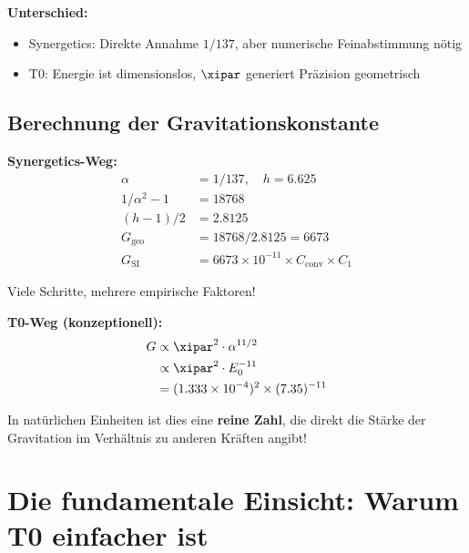 	\textbf{Unterschied:}
	\begin{itemize}
		\item Synergetics: Direkte Annahme $1/137$, aber numerische Feinabstimmung nötig
		\item T0: Energie ist dimensionslos, $\xipar$ generiert Präzision geometrisch
	\end{itemize}
	
	\subsection{Berechnung der Gravitationskonstante}
	
	\textbf{Synergetics-Weg:}
	\begin{align}
		\alpha &= 1/137, \quad h = 6.625 \\
		1/\alpha^2 - 1 &= 18768 \\
		(h-1)/2 &= 2.8125 \\
		G_{\text{geo}} &= 18768 / 2.8125 = 6673 \\
		G_{\text{SI}} &= 6673 \times 10^{-11} \times C_{\text{conv}} \times C_1
	\end{align}
	
	Viele Schritte, mehrere empirische Faktoren!
	
	\textbf{T0-Weg (konzeptionell):}
	\begin{align}
		G &\propto \xipar^2 \cdot \alpha^{11/2} \\
		&\propto \xipar^2 \cdot E_0^{-11} \\
		&= (1.333 \times 10^{-4})^2 \times (7.35)^{-11}
	\end{align}
	
	In natürlichen Einheiten ist dies eine \textbf{reine Zahl}, die direkt die Stärke der Gravitation im Verhältnis zu anderen Kräften angibt!
	
	\section{Die fundamentale Einsicht: Warum T0 einfacher ist}
	
